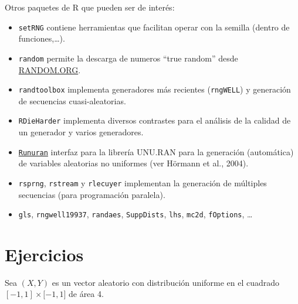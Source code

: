 \documentclass[
]{book}
\theoremstyle{break}
\theoremstyle{definition}
\theoremstyle{definition}
\theoremstyle{definition}
\theoremstyle{remark}
\let\BeginKnitrBlock\begin \let\EndKnitrBlock\end
\begin{document}
Otros paquetes de R que pueden ser de interés:

\begin{itemize}
\item
  \texttt{setRNG} contiene herramientas que facilitan operar con la semilla
  (dentro de funciones,\ldots).
\item
  \texttt{random} permite la descarga de numeros ``true random'' desde \href{https://www.random.org}{RANDOM.ORG}.
\item
  \texttt{randtoolbox} implementa generadores más recientes (\texttt{rngWELL}) y
  generación de secuencias cuasi-aleatorias.
\item
  \texttt{RDieHarder} implementa diversos contrastes para el análisis de la
  calidad de un generador y varios generadores.
\item
  \href{http://statmath.wu.ac.at/unuran}{\texttt{Runuran}} interfaz para la librería UNU.RAN para la
  generación (automática) de variables aleatorias no uniformes (ver Hörmann et al., 2004).
\item
  \texttt{rsprng}, \texttt{rstream} y \texttt{rlecuyer} implementan la generación de múltiples
  secuencias (para programación paralela).
\item
  \texttt{gls}, \texttt{rngwell19937}, \texttt{randaes}, \texttt{SuppDists}, \texttt{lhs}, \texttt{mc2d},
  \texttt{fOptions}, \ldots{}
\end{itemize}

\hypertarget{ejercicios}{%
\section{Ejercicios}\label{ejercicios}}

\BeginKnitrBlock{exercise}
\protect\hypertarget{exr:simpi}{}{\label{exr:simpi} }
\EndKnitrBlock{exercise}

Sea \((X,Y)\) es un vector aleatorio con distribución uniforme en el
cuadrado \([-1,1]\times\lbrack-1,1]\) de área 4.
\end{document}
